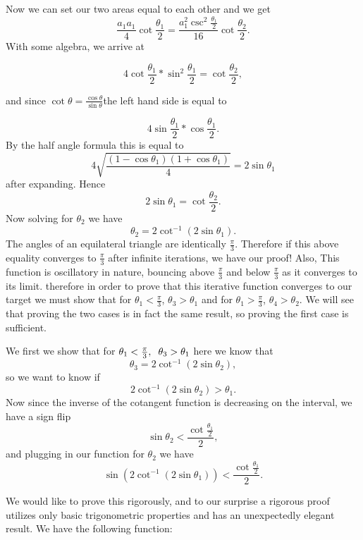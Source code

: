 \documentclass[12pt]{report}
\numberwithin{definition}{section}
\begin{document}
Now we can set our two areas equal to each other and we get 
\[
 \frac{a_1a_1}{4}\cot{\frac{\theta_1}{2}} = \frac{a_1^2\csc^2{ \frac{\theta_1}{2}}}{16}\cot{\frac{\theta_2}{2}}.
\]
With some algebra, we arrive at 

\[
4\cot{\frac{\theta_1}{2}}*\sin^2{\frac{\theta_1}{2}}= \cot{\frac{\theta_2}{2}},
\]

and since $\cot{\theta} = \frac{\cos{\theta}}{\sin{\theta}}$the left hand side is equal to
 
\[
4\sin{\frac{\theta_1}{2}}*\cos{\frac{\theta_1}{2}}.
\]
By the half angle formula this is equal to 
\[
4\sqrt{\frac{(1-\cos{\theta_1})(1+\cos{\theta_1})}{4}} = 2\sin{\theta_1}
\]
after expanding. Hence 
\[
2\sin{\theta_1} = \cot{\frac{\theta_2}{2}}.
\]
Now solving for $\theta_2$ we have 
\begin{equation}\label{eventoodd}
\theta_2 = 2\cot^{-1}{(2\sin{\theta_1})}.
\end{equation}
 The angles of an equilateral triangle are identically $\frac{\pi}{3}$. Therefore if this above equality converges to $\frac{\pi}{3}$ after infinite iterations, we have our proof! Also, This function is oscillatory in nature, bouncing above $\frac{\pi}{3}$ and below $\frac{\pi}{3}$ as it converges to its limit. therefore  in order to prove that this iterative function converges to our target we must show that for $\theta_1 < \frac{\pi}{3}$,  \hspace{2mm}  $\theta_3 > \theta_1 $ and for $\theta_1 > \frac{\pi}{3}$,\hspace{2mm} $\theta_4 > \theta_2$. We will see that proving the two cases is in fact the same result, so proving the first case is sufficient. 

	We first we show that  for $\theta_1 < \frac{\pi}{3},\hspace{2mm} \theta_3 > \theta_1 $ 
here we know that 
\[ 
 \theta_3 = 2\cot^{-1}{(2\sin{\theta_2})},
\]
so we want to know if 
\[
2\cot^{-1}{(2\sin{\theta_2})} > \theta_1.
\]
Now since the inverse of the cotangent function is decreasing on the interval, we have a sign flip
\[
 \sin{\theta_2} < \frac{  \cot{ \frac{\theta_1} {2}}   }  {2},
\]
and plugging in our function for $\theta_2$ we have 
\[
 \sin{ (2\cot^{-1}{(2\sin{\theta_1})})} < \frac{  \cot{ \frac{\theta_1} {2}}   }  {2}.
\]


We would like to prove this rigorously, and to our surprise a rigorous proof utilizes only basic trigonometric properties and has an unexpectedly elegant result.
We have the following function:
\end{document}
